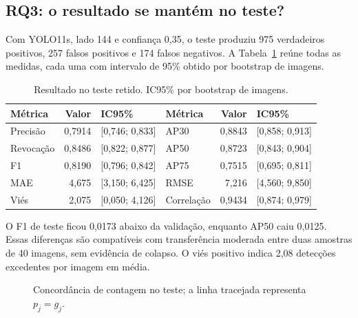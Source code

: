 \FloatBarrier
\subsection{RQ3: o resultado se mant\'em no teste?}

Com YOLO11s, lado 144 e confian\c{c}a 0,35, o teste produziu 975 verdadeiros
positivos, 257 falsos positivos e 174 falsos negativos. A
Tabela~\ref{tab:teste-unificado} re\'une todas as medidas, cada uma com intervalo
de 95\% obtido por bootstrap de imagens.

\begin{table}[htbp]
\centering
\caption{Resultado no teste retido. IC95\% por bootstrap de imagens.}
\label{tab:teste-unificado}
\small
\setlength{\tabcolsep}{5pt}
\begin{tabular}{lrl@{\hspace{8mm}}lrl}
\toprule
M\'etrica & Valor & IC95\% & M\'etrica & Valor & IC95\% \\
\midrule
Precis\~ao & 0,7914 & [0,746; 0,833] & AP30 & 0,8843 & [0,858; 0,913] \\
Revoca\c{c}\~ao & 0,8486 & [0,822; 0,877] & AP50 & 0,8723 & [0,843; 0,904] \\
F1 & 0,8190 & [0,796; 0,842] & AP75 & 0,7515 & [0,695; 0,811] \\
MAE & 4,675 & [3,150; 6,425] & RMSE & 7,216 & [4,560; 9,850] \\
Vi\'es & 2,075 & [0,050; 4,126] & Correla\c{c}\~ao & 0,9434 & [0,874; 0,979] \\
\bottomrule
\end{tabular}
\end{table}

O F1 de teste ficou 0,0173 abaixo da valida\c{c}\~ao, enquanto AP50 caiu 0,0125.
Essas diferen\c{c}as s\~ao compat\'iveis com transfer\^encia moderada entre duas
amostras de 40 imagens, sem evid\^encia de colapso. O vi\'es positivo indica 2,08
detec\c{c}\~oes excedentes por imagem em m\'edia.

\begin{figure}[htbp]
\centering
{}
\caption{Concord\^ancia de contagem no teste; a linha tracejada representa
$p_j=g_j$.}
\label{fig:contagem-pgf}
\end{figure}

